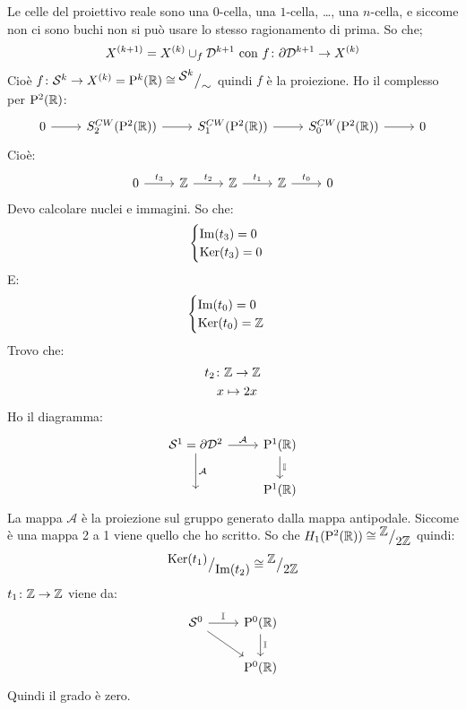 Le celle del proiettivo reale sono una $ 0 $-cella, una $ 1 $-cella, \dots, una
$ n $-cella, e siccome non ci sono buchi non si può usare lo stesso ragionamento
di prima. So che;
\[
  X^{(k+1)} = X^{(k)} \cup_f \mathcal{D}^{k+1} \text{ con } f \colon \partial \mathcal{D}^{k+1} \to X^{(k)}
\]
Cioè $ f \colon \mathcal{S}^{k} \to X^{(k)} = \mathrm{P}^k (\mathbb{R}) \cong {^{\textstyle \mathcal{S}^{k}}\big/_{\textstyle \sim}} $ quindi
$ f $ è la proiezione. Ho il complesso per $ \mathrm{P}^2 (\mathbb{R}) $:
\[
  \begin{tikzcd}
    0 \rar & S^{CW}_{2}(\Pjr{2}) \rar & S_1^{CW}(\Pjr{2}) \rar & S_{0}^{CW}(\Pjr{2}) \rar & 0
  \end{tikzcd}
\]
Cioè:
\[
  \begin{tikzcd}
    0 \rar{t_3} & \Z \rar{t_2} & \Z \rar{t_1} & \Z \rar{t_0} & 0
  \end{tikzcd}
\]
Devo calcolare nuclei e immagini. So che:
\[
  \begin{cases}
    \mathrm{Im}( t_3 ) = 0 \\
    \mathrm{Ker}( t_3) = 0
  \end{cases}
\]
E:
\[
  \begin{cases}
    \mathrm{Im}( t_0 ) = 0\\
    \mathrm{Ker}( t_0) = \mathbb{Z}
  \end{cases}
\]
Trovo che:
\begin{align*}
  t_2 \colon & \mathbb{Z} \to \mathbb{Z} \\
  x & \mapsto 2 x
\end{align*}
Ho il diagramma:
\[
  \begin{tikzcd}
    \Sph{1} = \partial \Disk{2} \rar{\mathcal{A}} \dar{\mathcal{A}} & \Pjr{1} \dar{\Id{}} \\
    {} & \Pjr{1}
  \end{tikzcd}
\]
La mappa $ \mathcal{A} $ è la proiezione sul gruppo generato dalla mappa antipodale.
Siccome è una mappa 2 a 1 viene quello che ho scritto.
So che $ H_1(\mathrm{P}^2 (\mathbb{R})) \cong {^{\textstyle \mathbb{Z}}\big/_{\textstyle 2 \mathbb{Z}}} $ quindi:
\[
  {^{\textstyle \mathrm{Ker}( t_1)}\big/_{\textstyle \mathrm{Im}( t_2 )}} \cong {^{\textstyle \mathbb{Z}}\big/_{\textstyle 2 \mathbb{Z}}}
\]
$ t_1 \colon \mathbb{Z} \to \mathbb{Z} $ viene da:
\[
  \begin{tikzcd}
    \Sph{0} \rar{\Id{}} \arrow{rd}{} & \Pjr{0} \dar{\Id{}} \\
    {} & \Pjr{0}
  \end{tikzcd}
\]
Quindi il grado è zero.


